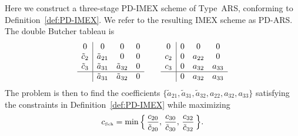 Here we construct a three-stage PD-IMEX scheme of Type~ARS, conforming to Definition~\ref{def:PD-IMEX}.  
We refer to the resulting IMEX scheme as PD-ARS.  
The double Butcher tableau is
\begin{equation}
  \begin{array}{c | c c c}
  	         0           & 0                 & 0                   & 0                    \\
  	\tilde{c}_{2} & \tilde{a}_{21} & 0                   & 0                    \\
  	\tilde{c}_{3} & \tilde{a}_{31} & \tilde{a}_{32} & 0                    \\ \hline
  	                   & \tilde{a}_{31} & \tilde{a}_{32} & 0
  \end{array}
  \qquad
  \begin{array}{c | c c c}
  	     0  & 0  & 0         & 0            \\
  	c_{2} & 0 & a_{22} & 0            \\
  	c_{3} & 0 & a_{32} & a_{33}       \\ \hline
  	         & 0 & a_{32} & a_{33}
  \end{array}
\end{equation}
The problem is then to find the coefficients $\{ \tilde{a}_{21}, \tilde{a}_{31}, \tilde{a}_{32}, a_{22}, a_{32}, a_{33} \}$ satisfying the constraints in Definition~\ref{def:PD-IMEX} while maximizing
\begin{equation}
  c_{\mbox{\tiny Sch}} = \min \Big\{\, \dfrac{c_{20}}{\tilde{c}_{20}},\, \dfrac{c_{30}}{\tilde{c}_{30}},\, \dfrac{c_{32}}{\tilde{c}_{32}} \,\Big\}.  
\end{equation}
